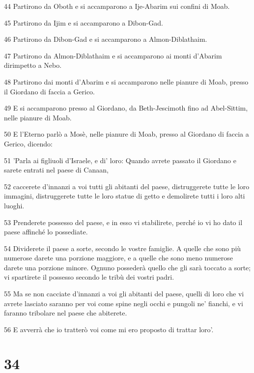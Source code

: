 \par 44 Partirono da Oboth e si accamparono a Ije-Abarim sui confini di Moab.
\par 45 Partirono da Ijim e si accamparono a Dibon-Gad.
\par 46 Partirono da Dibon-Gad e si accamparono a Almon-Diblathaim.
\par 47 Partirono da Almon-Diblathaim e si accamparono ai monti d'Abarim dirimpetto a Nebo.
\par 48 Partirono dai monti d'Abarim e si accamparono nelle pianure di Moab, presso il Giordano di faccia a Gerico.
\par 49 E si accamparono presso al Giordano, da Beth-Jescimoth fino ad Abel-Sittim, nelle pianure di Moab.
\par 50 E l'Eterno parlò a Mosè, nelle pianure di Moab, presso al Giordano di faccia a Gerico, dicendo:
\par 51 'Parla ai figliuoli d'Israele, e di' loro: Quando avrete passato il Giordano e sarete entrati nel paese di Canaan,
\par 52 caccerete d'innanzi a voi tutti gli abitanti del paese, distruggerete tutte le loro immagini, distruggerete tutte le loro statue di getto e demolirete tutti i loro alti luoghi.
\par 53 Prenderete possesso del paese, e in esso vi stabilirete, perché io vi ho dato il paese affinché lo possediate.
\par 54 Dividerete il paese a sorte, secondo le vostre famiglie. A quelle che sono più numerose darete una porzione maggiore, e a quelle che sono meno numerose darete una porzione minore. Ognuno possederà quello che gli sarà toccato a sorte; vi spartirete il possesso secondo le tribù dei vostri padri.
\par 55 Ma se non cacciate d'innanzi a voi gli abitanti del paese, quelli di loro che vi avrete lasciato saranno per voi come spine negli occhi e pungoli ne' fianchi, e vi faranno tribolare nel paese che abiterete.
\par 56 E avverrà che io tratterò voi come mi ero proposto di trattar loro'.

\chapter{34}

